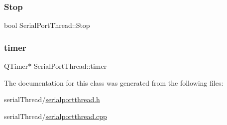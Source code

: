 \mbox{\label{class_serial_port_thread_ac859512ec7787398c77158a2f63e9be0}} 
\subsubsection{\texorpdfstring{Stop}{Stop}}
{\footnotesize\ttfamily bool Serial\+Port\+Thread\+::\+Stop\hspace{0.3cm}{\ttfamily [private]}}

\mbox{\label{class_serial_port_thread_aa1f0f4cbedd58026fb8a050aa013bcfa}} 
\subsubsection{\texorpdfstring{timer}{timer}}
{\footnotesize\ttfamily Q\+Timer$\ast$ Serial\+Port\+Thread\+::timer\hspace{0.3cm}{\ttfamily [private]}}



The documentation for this class was generated from the following files\+:\begin{DoxyCompactItemize}
\item 
serial\+Thread/\mbox{\hyperlink{serialportthread_8h}{serialportthread.\+h}}\item 
serial\+Thread/\mbox{\hyperlink{serialportthread_8cpp}{serialportthread.\+cpp}}\end{DoxyCompactItemize}
